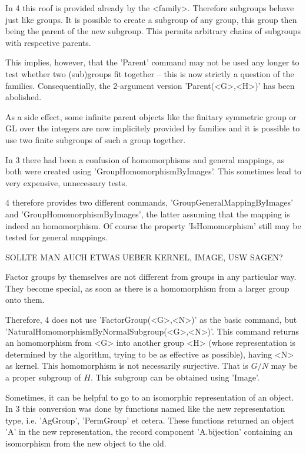 In {\GAP}4 this roof is provided already by the <family>. Therefore
subgroups behave just like groups. It is possible to create a subgroup of
any group, this group then being the parent of the new subgroup. This
permits arbitrary chains of subgroups with respective parents.

This implies, however, that the 'Parent' command may not be used any longer
to test whether two (sub)groups fit together -- this is now strictly a
question of the families. Consequentially, the 2-argument version
'Parent(<G>,<H>)' has been abolished.

As a side effect, some infinite parent objects like the finitary symmetric
group or GL over the integers are now implicitely provided by families and
it is possible to use two finite subgroups of such a group together.


In {\GAP}3 there had been a confusion of homomorphisms and general mappings,
as both were created using 'GroupHomomorphismByImages'. This sometimes lead
to very expensive, unnecessary tests.

{\GAP}4 therefore provides two different commands,
'GroupGeneralMappingByImages' and 'GroupHomomorphismByImages', the latter
assuming that the mapping is indeed an homomorphism. Of course the property
'IsHomomorphism' still may be tested for general mappings.

SOLLTE MAN AUCH ETWAS UEBER KERNEL, IMAGE, USW SAGEN?

Factor groups by themselves are not different from groups in any particular
way. They become special, as soon as there is a homomorphism from a larger
group onto them.

Therefore, {\GAP}4 does not use 'FactorGroup(<G>,<N>)' as the basic command,
but 'NaturalHomomorphismByNormalSubgroup(<G>,<N>)'. This command returns an
homomorphism from <G> into another group <H> (whose representation is
determined by the algorithm, trying to be as effective as possible), having
<N> as kernel. This homomorphism is not necessarily surjective. That is
$G/N$ may be a proper subgroup of $H$. This subgroup can be obtained using
'Image'.


Sometimes, it can be helpful to go to an isomorphic representation of an
object. In {\GAP}3 this conversion was done by functions named like the new
representation type, i.e. 'AgGroup', 'PermGroup' et cetera. These functions
returned an object 'A' in the new representation, the record component
'A.bijection' containing an isomorphism from the new object to the old.

